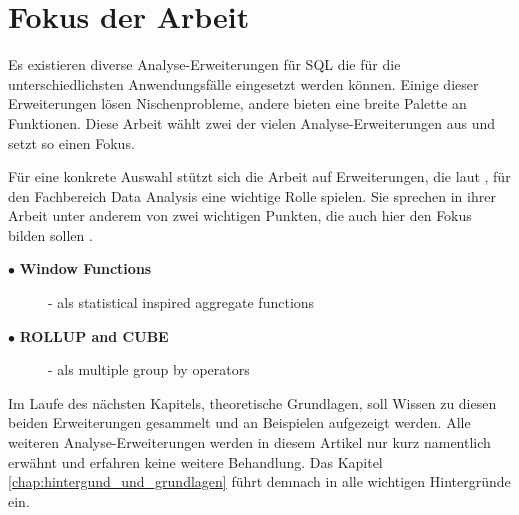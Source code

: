 \section{Fokus der Arbeit}
\label{sec:fokus_der_arbeit} Es existieren diverse Analyse-Erweiterungen für SQL
die für die unterschiedlichsten Anwendungsfälle eingesetzt werden können. Einige
dieser Erweiterungen lösen Nischenprobleme, andere bieten eine breite Palette an
Funktionen. Diese Arbeit wählt zwei der vielen Analyse-Erweiterungen aus und
setzt so einen Fokus.

Für eine konkrete Auswahl stützt sich die Arbeit auf Erweiterungen, die laut \citet[S.
245]{FOTACHE2015243}, für den Fachbereich Data Analysis eine wichtige Rolle spielen.
Sie sprechen in ihrer Arbeit unter anderem von zwei wichtigen Punkten, die auch hier
den Fokus bilden sollen \citep[vgl.][S. 245]{FOTACHE2015243}.

\begin{description}
	\item[$\bullet$ \textbf{Window Functions}] - als statistical inspired aggregate
		functions \\ \citep[vgl.][S. 245]{FOTACHE2015243}

	\item[$\bullet$ \textbf{ROLLUP and CUBE}] - als multiple group by operators \\
		\citep[vgl.][S. 247 - 248]{FOTACHE2015243}
\end{description}

Im Laufe des nächsten Kapitels, theoretische Grundlagen, soll Wissen zu diesen beiden
Erweiterungen gesammelt und an Beispielen aufgezeigt werden. Alle weiteren
Analyse-Erweiterungen werden in diesem Artikel nur kurz namentlich erwähnt und
erfahren keine weitere Behandlung. Das Kapitel \ref{chap:hintergund_und_grundlagen}
führt demnach in alle wichtigen Hintergründe ein.